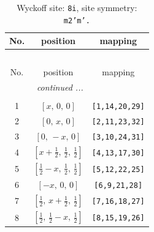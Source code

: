\documentclass[fleqn,8pt]{jsarticle}
\begin{document}
\begin{longtable}{ccc}
\caption{Wyckoff site: {\tt 8i}, site symmetry: {\tt m2'm'.}}
 \\
 \hline \hline
No. & position & mapping \\ \hline \endfirsthead

\multicolumn{2}{l}{\tablename\ \thetable{}} \\
 \hline \hline
No. & position & mapping \\ \hline \endhead

 \hline \hline
\multicolumn{2}{r}{\footnotesize\it continued ...} \\ \endfoot

 \hline \hline
\multicolumn{2}{r}{} \\ \endlastfoot

1 & $\left[ x,\, 0,\, 0 \right]$ & {\tt [1,14,20,29]} \\ \hline
2 & $\left[ 0,\, x,\, 0 \right]$ & {\tt [2,11,23,32]} \\ \hline
3 & $\left[ 0,\, - x,\, 0 \right]$ & {\tt [3,10,24,31]} \\ \hline
4 & $\left[ x + \frac{1}{2},\, \frac{1}{2},\, \frac{1}{2} \right]$ & {\tt [4,13,17,30]} \\ \hline
5 & $\left[ \frac{1}{2} - x,\, \frac{1}{2},\, \frac{1}{2} \right]$ & {\tt [5,12,22,25]} \\ \hline
6 & $\left[ - x,\, 0,\, 0 \right]$ & {\tt [6,9,21,28]} \\ \hline
7 & $\left[ \frac{1}{2},\, x + \frac{1}{2},\, \frac{1}{2} \right]$ & {\tt [7,16,18,27]} \\ \hline
8 & $\left[ \frac{1}{2},\, \frac{1}{2} - x,\, \frac{1}{2} \right]$ & {\tt [8,15,19,26]} \\
\end{longtable}
\renewcommand{\arraystretch}{1.2}
\end{document}
